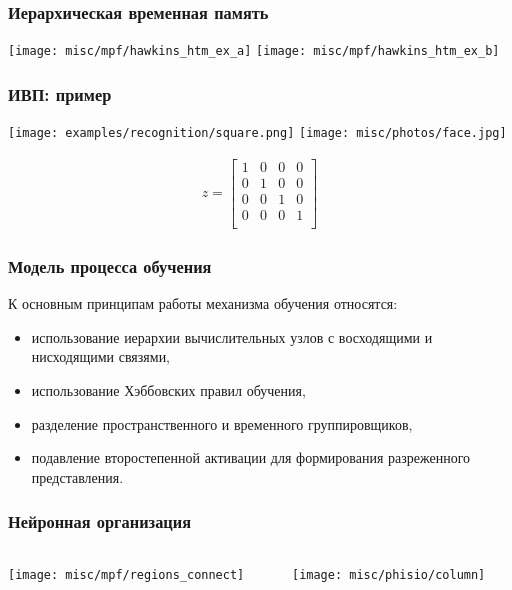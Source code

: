 \documentclass[default]{beamer}
\begin{document}
	\begin{frame}
		\frametitle{Иерархическая временная память}
		
		\begin{center}
		\texttt{[image: misc/mpf/hawkins\_htm\_ex\_a]}
		\texttt{[image: misc/mpf/hawkins\_htm\_ex\_b]}
		\end{center}

	\end{frame}
	
	\begin{frame}
		\frametitle{ИВП: пример}
		
		\begin{center}
			\texttt{[image: examples/recognition/square.png]}
			\texttt{[image: misc/photos/face.jpg]}
		\end{center}
		\begin{align*}
		z=\left[\begin{array}{cccc}
		1 & 0 & 0 & 0 \\ 
		0 & 1 & 0 & 0\\ 
		0 & 0 & 1  & 0\\
		0 & 0 & 0  & 1\\
		\end{array}\right]
		\end{align*}
	\end{frame}

	\begin{frame}
		\frametitle{Модель процесса обучения}
		
		К основным принципам работы механизма обучения относятся: 
		
		\begin{itemize}
			\item использование иерархии вычислительных узлов с восходящими и нисходящими связями, 
			\item использование Хэббовских правил обучения, 
			\item разделение пространственного и временного группировщиков, 
			\item подавление второстепенной активации для формирования разреженного представления.
		\end{itemize}
		
	\end{frame}	
	
	\begin{frame}
		\frametitle{Нейронная организация}
		
		\begin{columns}
		\begin{column}{0.65\textwidth}
		\texttt{[image: misc/mpf/regions\_connect]}
		\end{column}
		\begin{column}{0.35\textwidth}
		\texttt{[image: misc/phisio/column]}
		\end{column}
		\end{columns}

	\end{frame}
		
\end{document}
